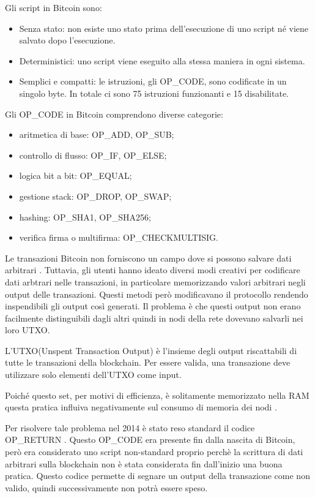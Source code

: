 Gli script \cite{opcode} in Bitcoin sono:
\begin{itemize}
    \item Senza stato: non esiste uno stato prima dell'esecuzione di uno script né viene salvato dopo l'esecuzione.
    \item Deterministici: uno script viene eseguito alla stessa maniera in ogni sistema.
    \item Semplici e compatti: le istruzioni, gli OP\_CODE, sono codificate in un singolo byte. In totale ci sono 75 istruzioni funzionanti e 15 disabilitate.
\end{itemize}
Gli OP\_CODE in Bitcoin comprendono diverse categorie:
\begin{itemize}
    \item aritmetica di base: OP\_ADD, OP\_SUB;
    \item controllo di flusso: OP\_IF, OP\_ELSE;
    \item logica bit a bit: OP\_EQUAL;
    \item gestione stack: OP\_DROP, OP\_SWAP;
    \item hashing: OP\_SHA1, OP\_SHA256;
    \item verifica firma o multifirma: OP\_CHECKMULTISIG.
\end{itemize}

Le transazioni Bitcoin non forniscono un campo dove si possono salvare dati arbitrari \cite{arbdata}. Tuttavia, gli utenti hanno ideato diversi modi creativi per codificare dati arbtrari nelle transazioni, in particolare memorizzando valori arbitrari negli output delle transazioni. Questi metodi però modificavano il protocollo rendendo inspendibili gli output così generati. Il problema è che questi output non erano facilmente distinguibili dagli altri quindi in nodi della rete dovevano salvarli nei loro UTXO.

L'UTXO(Unspent Transaction Output) è l'insieme degli output riscattabili di tutte le transazioni della blockchain. Per essere valida, una transazione deve utilizzare solo elementi dell'UTXO come input.

Poiché questo set, per motivi di efficienza, è solitamente memorizzato nella RAM \cite{utxo} questa pratica influiva negativamente sul consumo di memoria dei nodi \cite{stresstest}.

Per risolvere tale problema nel 2014 è stato reso standard il codice OP\_RETURN \cite{opreturnstandard} . Questo OP\_CODE era presente fin dalla nascita di Bitcoin, però era considerato uno script non-standard proprio perchè la scrittura di dati arbitrari sulla blockchain non è stata considerata fin dall'inizio una buona pratica. Questo codice permette di segnare un output della transazione come non valido, quindi successivamente non potrà essere speso.

